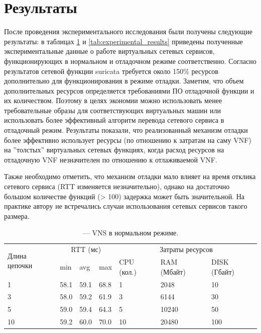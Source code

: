 \documentclass[oneside,final,14pt,a4paper]{extreport}
\begin{document}
\section{Результаты}
После проведения экспериментального исследования были получены следующие результаты: в таблицах \ref{tab:normal_experimental_results} и \ref{tab:experimental_results} приведены полученные экспериментальные данные о работе виртуальных сетевых сервисов, функционирующих в нормальном и отладочном режиме соответственно. Согласно результатов сетевой функции suricata требуется около 150\% ресурсов дополнительно для функционирования в режиме отладки. Заметим, что объем дополнительных ресурсов определяется требованиями ПО отладочной функции и их количеством. Поэтому в целях экономии можно использовать менее требовательные образы для соответствующих виртуальных машин или использовать более эффективный алгоритм перевода сетевого сервиса в отладочный режим. Результаты показали, что реализованный механизм отладки более эффективно использует ресурсы (по отношению к затратам на саму VNF) на ''толстых'' виртуальных сетевых функциях, когда расход ресурсов на отладочную VNF незначителен по отношению к отлаживаемой VNF.

Также необходимо отметить, что механизм отладки мало влияет на время отклика сетевого сервиса (RTT изменяется незначительно), однако на достаточно большом количестве функций (> 100) задержка может быть значительной. На практике автору не встречались случаи использования сетевых сервисов такого размера.

\renewcommand{\arraystretch}{1.5}
\begin{table}[h]
\center %
\begin{tabular}{|p{}|p{}|p{}|p{}|p{}|p{}|p{}|} %
\hline %
\multirow{2}{1}{Длина цепочки} & \multicolumn{3}{c|}{RTT (мс)} & \multicolumn{3}{c|}{Затраты ресурсов} \\
\cline{2-7}
& min & avg & max & CPU (кол.) & RAM (Мбайт) & DISK (Гбайт) \\
\hline
1 & 58.1 & 59.1 & 68.8 & 1 & 2048 & 10 \\
\hline
3 & 58.0 & 59.2 & 61.9 & 3 & 6144 & 30 \\
\hline
5 & 59.0 & 59.4 & 64.3 & 5 & 10240 & 50 \\
\hline
10 & 59.2 & 60.0 & 70.0 & 10 & 20480 & 100 \\
\hline
\end{tabular}
\caption{--- VNS в нормальном режиме.}
\label{tab:normal_experimental_results}
\end{table}
\end{document}
